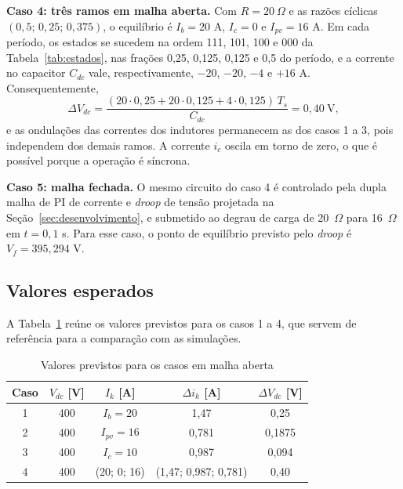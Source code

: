 \textbf{Caso 4: três ramos em malha aberta.} Com $R=20\ \Omega$ e as razões cíclicas $(0{,}5;\,0{,}25;\,0{,}375)$, o equilíbrio é $I_b=20$ A, $I_c=0$ e $I_{pv}=16$ A. Em cada período, os estados se sucedem na ordem 111, 101, 100 e 000 da Tabela~\ref{tab:estados}, nas frações 0,25, 0,125, 0,125 e 0,5 do período, e a corrente no capacitor $C_{dc}$ vale, respectivamente, $-20$, $-20$, $-4$ e $+16$ A. Consequentemente,
\begin{equation}
\Delta V_{dc}=\frac{(20\cdot0{,}25+20\cdot0{,}125+4\cdot0{,}125)\,T_s}{C_{dc}}=0{,}40\ \text{V},
\end{equation}
e as ondulações das correntes dos indutores permanecem as dos casos 1 a 3, pois independem dos demais ramos. A corrente $i_c$ oscila em torno de zero, o que é possível porque a operação é síncrona.

\textbf{Caso 5: malha fechada.} O mesmo circuito do caso 4 é controlado pela dupla malha de PI de corrente e \textit{droop} de tensão projetada na Seção~\ref{sec:desenvolvimento}, e submetido ao degrau de carga de 20~$\Omega$ para 16~$\Omega$ em $t=0{,}1$ s. Para esse caso, o ponto de equilíbrio previsto pelo \textit{droop} é $V_f=395{,}294$ V.

\subsection{Valores esperados}

A Tabela~\ref{tab:esperado} reúne os valores previstos para os casos 1 a 4, que servem de referência para a comparação com as simulações.

\begin{table}[H]
\centering
\caption{Valores previstos para os casos em malha aberta}
\label{tab:esperado}
\footnotesize
\setlength{\tabcolsep}{3pt}
\begin{tabular}{ccccc}
\toprule
Caso & $V_{dc}$ [V] & $I_k$ [A] & $\Delta i_k$ [A] & $\Delta V_{dc}$ [V] \\
\midrule
1 & 400 & $I_b=20$ & 1,47 & 0,25 \\
2 & 400 & $I_{pv}=16$ & 0,781 & 0,1875 \\
3 & 400 & $I_c=10$ & 0,987 & 0,094 \\
4 & 400 & (20; 0; 16) & (1,47; 0,987; 0,781) & 0,40 \\
\bottomrule
\end{tabular}
\end{table}
